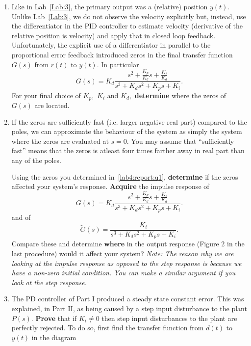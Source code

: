 \begin{deliverable}[label={lab4:report}]
  \begin{enumerate}[label={(\arabic*)}]
    \item{%
      Like in Lab~\ref{Lab:3}, the primary output was a (relative) position \(y(t).\)
      Unlike Lab~\ref{Lab:3}, we do not observe the velocity explicitly but, instead, use the differentiator in the PID controller to estimate velocity (derivative of the relative position is velocity) and apply that in closed loop feedback.
      Unfortunately, the explicit use of a differentiator in parallel to the proportional error feedback introduced zeros in the final transfer function \(G(s)\) from \(r(t)\) to \(y(t).\)
      In particular
      \[
        G(s) = K_d \frac{s^2 + \frac{K_p}{K_d} s + \frac{K_i}{K_d}}{s^3 + K_d s^2 + K_p s + K_i}.
      \]
      For your final choice of \(K_p,\) \(K_i\) and \(K_d,\) \textbf{determine} where the zeros of \(G(s)\) are located.
      \label{lab4:report:q1}
    }
    \item{%
      If the zeros are sufficiently fast (i.e. larger negative real part) compared to the poles, we can approximate the behaviour of the system as simply the system where the zeros are evaluated at \(s = 0.\)
      You may assume that ``sufficiently fast'' means that the zeros is atleast four times farther away in real part than any of the poles.

      Using the zeros you determined in~\ref{lab4:report:q1}, \textbf{determine} if the zeros affected your system's response.
      \textbf{Acquire} the impulse response of
      \[
        G(s) = K_d \frac{s^2 + \frac{K_p}{K_d} s + \frac{K_i}{K_d}}{s^3 + K_d s^2 + K_p s + K_i}.
      \]
      and of
      \[
        \tilde{G}(s)  = \frac{K_i}{s^3 + K_d s^2 + K_p s + K_i}.
      \]
      Compare these and determine \textbf{where} in the output response (Figure 2 in the last procedure) would it affect your system?
      \emph{Note: The reason why we are looking at the impulse response as opposed to the step response is because we have a non-zero initial condition. You can make a similar argument if you look at the step response.}
      \label{lab4:report:q2}
    }
    \item{%
      The PD controller of Part I produced a steady state constant error.
      This was explained, in Part II, as being caused by a step input disturbance to the plant \(P(s).\)
      \textbf{Prove} that if \(K_i \neq 0\) then step input disturbances to the plant are perfectly rejected.
      To do so, first find the transfer function from \(d(t)\) to \(y(t)\) in the diagram
      \begin{center}
        \begin{tikzpicture}[x=1in, y=1in]


\end{tikzpicture}
\end{center}}
\end{enumerate}
\end{deliverable}

